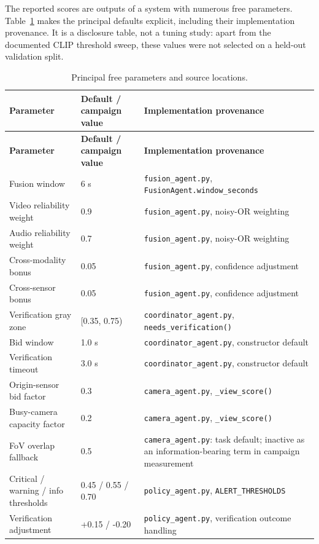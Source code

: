 The reported scores are outputs of a system with numerous free parameters.
Table~\ref{tab:parameters} makes the principal defaults explicit, including
their implementation provenance. It is a disclosure table, not a tuning study:
apart from the documented CLIP threshold sweep, these values were not selected
on a held-out validation split.

\small
\begin{longtable}{p{3.7cm}p{2.1cm}p{5.9cm}}
\caption{Principal free parameters and source locations.}\label{tab:parameters}\\
\toprule
\textbf{Parameter} & \textbf{Default / campaign value} & \textbf{Implementation provenance} \\
\midrule
\endfirsthead
\toprule
\textbf{Parameter} & \textbf{Default / campaign value} & \textbf{Implementation provenance} \\
\midrule
\endhead
Fusion window & 6 s & \texttt{fusion\_agent.py}, \texttt{FusionAgent.window\_seconds} \\
Video reliability weight & 0.9 & \texttt{fusion\_agent.py}, noisy-OR weighting \\
Audio reliability weight & 0.7 & \texttt{fusion\_agent.py}, noisy-OR weighting \\
Cross-modality bonus & 0.05 & \texttt{fusion\_agent.py}, confidence adjustment \\
Cross-sensor bonus & 0.05 & \texttt{fusion\_agent.py}, confidence adjustment \\
Verification gray zone & [0.35, 0.75) & \texttt{coordinator\_agent.py}, \texttt{needs\_verification()} \\
Bid window & 1.0 s & \texttt{coordinator\_agent.py}, constructor default \\
Verification timeout & 3.0 s & \texttt{coordinator\_agent.py}, constructor default \\
Origin-sensor bid factor & 0.3 & \texttt{camera\_agent.py}, \texttt{\_view\_score()} \\
Busy-camera capacity factor & 0.2 & \texttt{camera\_agent.py}, \texttt{\_view\_score()} \\
FoV overlap fallback & 0.5 & \texttt{camera\_agent.py}: task default; inactive as an information-bearing term in campaign measurement \\
Critical / warning / info thresholds & 0.45 / 0.55 / 0.70 & \texttt{policy\_agent.py}, \texttt{ALERT\_THRESHOLDS} \\
Verification adjustment & +0.15 / -0.20 & \texttt{policy\_agent.py}, verification outcome handling \\

\end{longtable}
